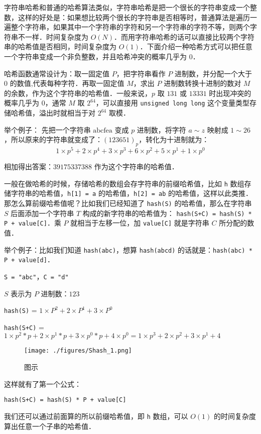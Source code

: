 
字符串哈希和普通的哈希算法类似，字符串哈希是把一个很长的字符串变成一个整数，这样的好处是：如果想比较两个很长的字符串是否相等时，普通算法是遍历一遍整个字符串，如果其中一个字符串的字符和另一个字符串的字符不等，则两个字符串不一样．时间复杂度为 $O(N)$．而用字符串哈希的话可以直接比较两个字符串的哈希值是否相同，时间复杂度为 $O(1)$．下面介绍一种哈希方式可以把任意一个字符串变成一个非负整数，并且哈希冲突的概率几乎为 $0$．

哈希函数通常设计为：取一固定值 $P$，把字符串看作 $P$ 进制数，并分配一个大于 $0$ 的数值,代表每种字符．再取一固定值 $M$，求出 $P$ 进制数转换十进制的数对 $M$ 的余数，作为这个字符串的哈希值．一般来说，$p$ 取 $131$ 或 $13331$ 时出现冲突的概率几乎为 $0$，通常 $M$ 取 $2^{64}$，可以直接用 \verb|unsigned long long| 这个变量类型存储哈希值，溢出时就相当于对 $2^{64}$ 取模．

举个例子：
先把一个字符串 $\text{abcfea}$ 变成 $p$ 进制数，将字符 $a \sim z$ 映射成 $1 \sim 26$，所以原来的字符串就变成了：$(123651)_p$，转化为十进制就为：\begin{equation}
1 \times p^5 + 2 \times p^4 + 3 \times p^3 + 6 \times p^2 + 5 \times p^1 + 1 \times p^0
\end{equation}

相加得出答案：$39175337388$ 作为这个字符串的哈希值．

一般在做哈希的时候，存储哈希的数组会存字符串的前缀哈希值，比如 \verb|h| 数组存储字符串的哈希值，\verb|h[1] = a| 的哈希值，\verb|h[2] = ab| 的哈希值，这样以此类推．那怎么算前缀哈希值呢？比如我们已经知道了 \verb|hash(S)| 的哈希值，那么在字符串 $S$ 后面添加一个字符串 $T$ 构成的新字符串的哈希值为： \verb|hash(S+C) = hash(S) * P + value[C]|．乘 $P$ 就相当于左移一位，加 \verb|value[C]| 就是字符串 $C$ 所分配的数值．

举个例子：比如我们知道 \verb|hash(abc)|，想算 \verb|hash(abcd)| 的话就是：\verb|hash(abc) * P + value[d]|．

\verb|S = "abc"|，\verb|C = "d"|

$S$ 表示为 $P$ 进制数：$123$

\verb|hash(S)| = $1 \times P^2 + 2 \times P^1 + 3 \times P^0$

\verb|hash(S+C)| = $1 \times p^2 *p + 2 \times p^1*p + 3 \times p^0*p + 4 \times p^0 = 1 \times p^3 + 2 \times p ^ 2 + 3 \times p^1 + 4$

\begin{figure}[ht]
\centering
\texttt{[image: ./figures/Shash\_1.png]}
\caption{图示} \label{Shash_fig1}
\end{figure}

这样就有了第一个公式：

\verb|hash(S+C) = hash(S) * P + value[C]|

我们还可以通过前面算的所以前缀哈希值，即 \verb|h| 数组，可以 $O(1)$ 的时间复杂度算出任意一个子串的哈希值．